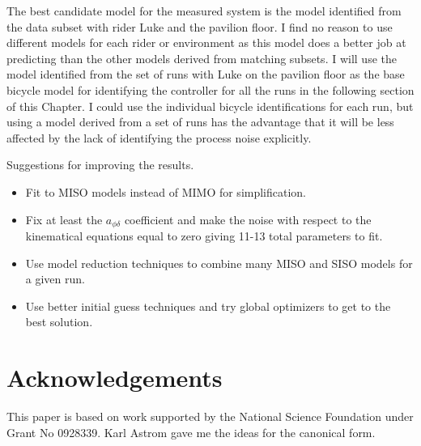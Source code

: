 \documentclass[a4paper]{article}
\begin{document}
The best candidate model for the measured system is the model identified
from the data subset with rider Luke and the pavilion floor. I find no
reason to use different models for each rider or environment as this
model does a better job at predicting than the other models derived from
matching subsets. I will use the model identified from the set of runs
with Luke on the pavilion floor as the base bicycle model for
identifying the controller for all the runs in the following section of
this Chapter. I could use the individual bicycle identifications for
each run, but using a model derived from a set of runs has the advantage
that it will be less affected by the lack of identifying the process
noise explicitly. %

Suggestions for improving the results.

\begin{itemize}
  \item
    Fit to MISO models instead of MIMO for simplification.
  \item
    Fix at least the $a_{\phi\delta}$ coefficient and make the noise with
    respect to the kinematical equations equal to zero giving 11-13 total
    parameters to fit.
  \item
    Use model reduction techniques to combine many MISO and SISO models
    for a given run.
  \item
    Use better initial guess techniques and try global optimizers to get
    to the best solution.
\end{itemize}

\section*{Acknowledgements}

This paper is based on work supported by the National Science Foundation under
Grant No 0928339. Karl Astrom gave me the ideas for the canonical form.




\end{document}
